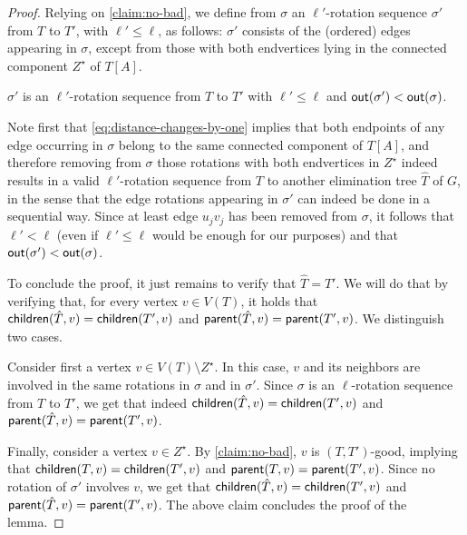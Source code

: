 \documentclass[a4paper,UKenglish,cleveref, autoref, thm-restate]{lipics-v2021}
\newenvironment{cproof}{\proof[Proof of claim]\renewcommand\qedsymbol{$\diamond$}}{\endproof}
\newcommand{\parent}{{\sf parent}\xspace}
\newcommand{\child}{{\sf children}\xspace}
\begin{document}
\begin{proof}
Relying on \autoref{claim:no-bad}, we define from $\sigma$ an $\ell'$-rotation sequence $\sigma'$ from $T$ to $T'$, with $\ell' \leq \ell$, as follows: $\sigma'$ consists of the (ordered) edges appearing in $\sigma$, except from those with both endvertices lying in the connected component $Z^{\star}$ of $T[A]$.
\begin{claim}\label{claim:indeed-better-sequance}
$\sigma'$ is  an $\ell'$-rotation sequence from $T$ to $T'$ with $\ell' \leq \ell$ and ${\sf out}(\sigma') < {\sf out}(\sigma)$.
\end{claim}
\begin{cproof}
Note first that \autoref{eq:distance-changes-by-one} implies that both endpoints of any edge occurring in $\sigma$ belong to the same connected component of $T[A]$, and therefore removing from $\sigma$ those rotations with both endvertices in $Z^{\star}$ indeed results in a valid $\ell'$-rotation sequence from $T$ to another elimination tree $\hat{T}$ of $G$, in the sense that the edge rotations appearing in $\sigma'$ can indeed be done in a sequential way. Since at least edge $u_jv_j$ has been removed from $\sigma$, it follows that $\ell' < \ell$ (even if $\ell' \leq \ell$ would be enough for our purposes) and that ${\sf out}(\sigma') < {\sf out}(\sigma)$.

To conclude the proof, it just remains to verify that $\hat{T}=T'$. We will do that by verifying that, for every vertex $v \in V(T)$, it holds that $\child(\hat{T},v)=\child(T',v)$ and $\parent(\hat{T},v)=\parent(T',v)$. We distinguish two cases.

Consider first a vertex $v \in V(T) \setminus Z^{\star}$. In this case, $v$ and its neighbors are involved in the same rotations in $\sigma$ and in $\sigma'$. Since $\sigma$ is an $\ell$-rotation sequence from $T$ to $T'$, we get that indeed $\child(\hat{T},v)=\child(T',v)$ and $\parent(\hat{T},v)=\parent(T',v)$.

Finally, consider  a vertex $v \in Z^{\star}$. By \autoref{claim:no-bad}, $v$ is $(T,T')$-good, implying that $\child(T,v)=\child(T',v)$ and $\parent(T,v)=\parent(T',v)$. Since no rotation of $\sigma'$ involves $v$, we get that $\child(\hat{T},v)=\child(T',v)$ and $\parent(\hat{T},v)=\parent(T',v)$.
\end{cproof}
The above claim concludes the proof of the lemma.\end{proof}
\end{document}
